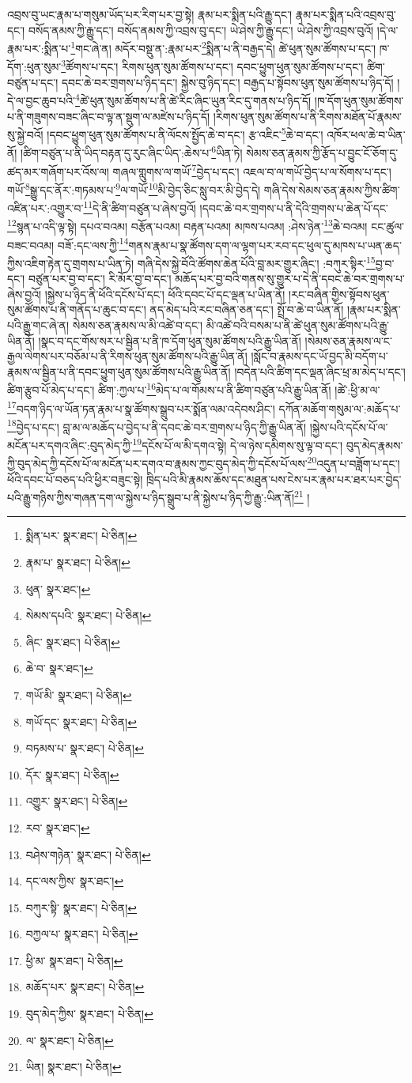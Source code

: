འབྲས་བུ་ཡང་རྣམ་པ་གསུམ་ཡོད་པར་རིག་པར་བྱ་སྟེ། རྣམ་པར་སྨིན་པའི་རྒྱུ་དང་། རྣམ་པར་སྨིན་པའི་འབྲས་བུ་དང་། བསོད་ནམས་ཀྱི་རྒྱུ་དང་། བསོད་ནམས་ཀྱི་འབྲས་བུ་དང་། ཡེ་ཤེས་ཀྱི་རྒྱུ་དང་། ཡེ་ཤེས་ཀྱི་འབྲས་བུའོ། །དེ་ལ་རྣམ་པར་:སྨིན་པ་\footnote{སྨིན་པར་  སྣར་ཐང་།  པེ་ཅིན། }གང་ཞེ་ན། མདོར་བསྡུ་ན་:རྣམ་པར་\footnote{རྣམ་པ་  སྣར་ཐང་།  པེ་ཅིན། }སྨིན་པ་ནི་བརྒྱད་དེ། ཚེ་ཕུན་སུམ་ཚོགས་པ་དང་། ཁ་དོག་:ཕུན་སུམ་\footnote{ཕུན་  སྣར་ཐང་། }ཚོགས་པ་དང་། རིགས་ཕུན་སུམ་ཚོགས་པ་དང་། དབང་ཕྱུག་ཕུན་སུམ་ཚོགས་པ་དང་། ཚིག་བཙུན་པ་དང་། དབང་ཆེ་བར་གྲགས་པ་ཉིད་དང་། སྐྱེས་བུ་ཉིད་དང་། བརྒྱད་པ་སྟོབས་ཕུན་སུམ་ཚོགས་པ་ཉིད་དོ། །དེ་ལ་བྱང་ཆུབ་པའི་\footnote{སེམས་དཔའི་  སྣར་ཐང་།  པེ་ཅིན། }ཚེ་ཕུན་སུམ་ཚོགས་པ་ནི་ཚེ་རིང་ཞིང་ཡུན་རིང་དུ་གནས་པ་ཉིད་དོ། །ཁ་དོག་ཕུན་སུམ་ཚོགས་པ་ནི་གཟུགས་བཟང་ཞིང་བ་ལྟ་ན་སྡུག་ལ་མཛེས་པ་ཉིད་དོ། །རིགས་ཕུན་སུམ་ཚོགས་པ་ནི་རིགས་མཐོན་པོ་རྣམས་སུ་སྐྱེ་བའོ། །དབང་ཕྱུག་ཕུན་སུམ་ཚོགས་པ་ནི་ལོངས་སྤྱོད་ཆེ་བ་དང་། རྩ་འཇིང་\footnote{ཞིང་  སྣར་ཐང་།  པེ་ཅིན། }ཆེ་བ་དང་། འཁོར་ཕལ་ཆེ་བ་ཡིན་ནོ། །ཚིག་བཙུན་པ་ནི་ཡིད་བརྟན་དུ་རུང་ཞིང་ཡིད་:ཆེས་པ་\footnote{ཆེ་བ་  སྣར་ཐང་། }ཡིན་ཏེ། སེམས་ཅན་རྣམས་ཀྱི་རྩོད་པ་བྱུང་ངོ་ཅོག་དུ་ཚད་མར་གཞོག་པར་འོས་ལ། གཞལ་གླུགས་ལ་གཡོ་\footnote{གཡོ་མི་  སྣར་ཐང་།  པེ་ཅིན། }བྱེད་པ་དང་། འཇལ་བ་ལ་གཡོ་བྱེད་པ་ལ་སོགས་པ་དང་། གཡོ་\footnote{གཡོ་དང་  སྣར་ཐང་།  པེ་ཅིན། }སྒྱུ་དང་ནོར་:གཏམས་པ་\footnote{བཏམས་པ་  སྣར་ཐང་།  པེ་ཅིན། }ལ་གཡོ་\footnote{དོར་  སྣར་ཐང་།  པེ་ཅིན། }མི་བྱེད་ཅིང་སླུ་བར་མི་བྱེད་དེ། གཞི་དེས་སེམས་ཅན་རྣམས་ཀྱིས་ཚིག་འཛིན་པར་:འགྱུར་བ་\footnote{འགྱུར་  སྣར་ཐང་།  པེ་ཅིན། }དེ་ནི་ཚིག་བཙུན་པ་ཞེས་བྱའོ། །དབང་ཆེ་བར་གྲགས་པ་ནི་དེའི་གྲགས་པ་ཆེན་པོ་དང་\footnote{རབ་  སྣར་ཐང་། }སྙན་པ་འདི་ལྟ་སྟེ། དཔའ་བའམ། བརྩོན་པའམ། བརྟན་པའམ། མཁས་པའམ། :ཤེས་ཉེན་\footnote{བཤེས་གཉེན་  སྣར་ཐང་།  པེ་ཅིན། }ཆེ་བའམ། ངང་ཚུལ་བཟང་བའམ། བཟོ་:དང་ལས་ཀྱི་\footnote{དང་ལས་ཀྱིས་  སྣར་ཐང་། }གནས་རྣམ་པ་སྣ་ཚོགས་དག་ལ་ལྷག་པར་རབ་དང་ཕུལ་དུ་མཁས་པ་ཡན་ཆད་ཀྱིས་འཇིག་རྟེན་དུ་གྲགས་པ་ཡིན་ཏེ། གཞི་དེས་སྐྱེ་བོའི་ཚོགས་ཆེན་པོའི་བླ་མར་གྱུར་ཞིང་། :བཀུར་སྟིར་\footnote{བཀུར་སྟི་  སྣར་ཐང་།  པེ་ཅིན། }བྱ་བ་དང་། བཙུན་པར་བྱ་བ་དང་། རི་མོར་བྱ་བ་དང་། མཆོད་པར་བྱ་བའི་གནས་སུ་གྱུར་པ་དེ་ནི་དབང་ཆེ་བར་གྲགས་པ་ཞེས་བྱའོ། །སྐྱེས་པ་ཉིད་ནི་ཕོའི་དངོས་པོ་དང་། ཕོའི་དབང་པོ་དང་ལྡན་པ་ཡིན་ནོ། །རང་བཞིན་གྱིས་སྟོབས་ཕུན་སུམ་ཚོགས་པ་ནི་གནོད་པ་ཆུང་བ་དང་། ནད་མེད་པའི་རང་བཞིན་ཅན་དང་། སྤྲོ་བ་ཆེ་བ་ཡིན་ནོ། །རྣམ་པར་སྨིན་པའི་རྒྱུ་གང་ཞེ་ན། སེམས་ཅན་རྣམས་ལ་མི་འཚེ་བ་དང་། མི་འཚེ་བའི་བསམ་པ་ནི་ཚེ་ཕུན་སུམ་ཚོགས་པའི་རྒྱུ་ཡིན་ནོ། །སྣང་བ་དང་གོས་སར་པ་སྦྱིན་པ་ནི་ཁ་དོག་ཕུན་སུམ་ཚོགས་པའི་རྒྱུ་ཡིན་ནོ། །སེམས་ཅན་རྣམས་ལ་ང་རྒྱལ་ལེགས་པར་བཅོམ་པ་ནི་རིགས་ཕུན་སུམ་ཚོགས་པའི་རྒྱུ་ཡིན་ནོ། །སློང་བ་རྣམས་དང་ཡོ་བྱད་མི་བདོག་པ་རྣམས་ལ་སྦྱིན་པ་ནི་དབང་ཕྱུག་ཕུན་སུམ་ཚོགས་པའི་རྒྱུ་ཡིན་ནོ། །བདེན་པའི་ཚིག་དང་ལྡན་ཞིང་ཕྲ་མ་མེད་པ་དང་། ཚིག་རྩུབ་པོ་མེད་པ་དང་། ཚིག་:ཀྱལ་པ་\footnote{བཀྱལ་པ་  སྣར་ཐང་།  པེ་ཅིན། }མེད་པ་ལ་གོམས་པ་ནི་ཚིག་བཙུན་པའི་རྒྱུ་ཡིན་ནོ། །ཚེ་:ཕྱི་མ་ལ་\footnote{ཕྱི་མ་  སྣར་ཐང་།  པེ་ཅིན། }བདག་ཉིད་ལ་ཡོན་ཏན་རྣམ་པ་སྣ་ཚོགས་སྒྲུབ་པར་སྨོན་ལམ་འདེབས་ཤིང་། དཀོན་མཆོག་གསུམ་ལ་:མཆོད་པ་\footnote{མཆོད་པར་  སྣར་ཐང་།  པེ་ཅིན། }བྱེད་པ་དང་། བླ་མ་ལ་མཆོད་པ་བྱེད་པ་ནི་དབང་ཆེ་བར་གྲགས་པ་ཉིད་ཀྱི་རྒྱུ་ཡིན་ནོ། །སྐྱེས་པའི་དངོས་པོ་ལ་མངོན་པར་དགའ་ཞིང་:བུད་མེད་ཀྱི་\footnote{བུད་མེད་ཀྱིས་  སྣར་ཐང་།  པེ་ཅིན། }དངོས་པོ་ལ་མི་དགའ་སྟེ། དེ་ལ་ཉེས་དམིགས་སུ་ལྟ་བ་དང་། བུད་མེད་རྣམས་ཀྱི་བུད་མེད་ཀྱི་དངོས་པོ་ལ་མངོན་པར་དགའ་བ་རྣམས་ཀྱང་བུད་མེད་ཀྱི་དངོས་པོ་ལས་\footnote{ལ་  སྣར་ཐང་།  པེ་ཅིན། }འདུན་པ་བཟློག་པ་དང་། ཕོའི་དབང་པོ་བཅད་པའི་ཕྱིར་བཟུང་སྟེ། ཁྲིད་པའི་མི་རྣམས་ཆོས་དང་མཐུན་པས་ངེས་པར་རྣམ་པར་ཐར་པར་བྱེད་པའི་རྒྱུ་གཉིས་ཀྱིས་གཞན་དག་ལ་སྐྱེས་པ་ཉིད་སྒྲུབ་པ་ནི་སྐྱེས་པ་ཉིད་ཀྱི་རྒྱུ་:ཡིན་ནོ།\footnote{ཡིན།  སྣར་ཐང་།  པེ་ཅིན། } །

